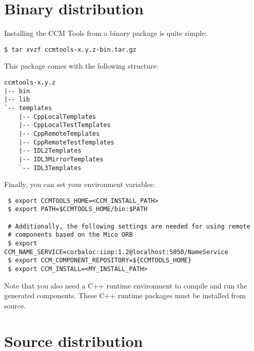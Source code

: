 \section{Binary distribution}

Installing the CCM Tools from a binary package is quite simple:
\begin{small}
\begin{verbatim}
$ tar xvzf ccmtools-x.y.z-bin.tar.gz 
\end{verbatim}
\end{small}

\noindent
This package comes with the following structure:
\begin{small}
\begin{verbatim}
ccmtools-x.y.z
|-- bin
|-- lib
`-- templates
    |-- CppLocalTemplates
    |-- CppLocalTestTemplates
    |-- CppRemoteTemplates
    |-- CppRemoteTestTemplates
    |-- IDL2Templates
    |-- IDL3MirrorTemplates
    `-- IDL3Templates
\end{verbatim}
\end{small}

\noindent
Finally, you can set your environment variables:

\begin{small}
\begin{verbatim}
 $ export CCMTOOLS_HOME=<CCM_INSTALL_PATH>
 $ export PATH=$CCMTOOLS_HOME/bin:$PATH	    

 # Additionally, the following settings are needed for using remote
 # components based on the Mico ORB
 $ export CCM_NAME_SERVICE=corbaloc:iiop:1.2@localhost:5050/NameService
 $ export CCM_COMPONENT_REPOSITORY=${CCMTOOLS_HOME} 
 $ export CCM_INSTALL=<MY_INSTALL_PATH>
\end{verbatim}
\end{small}

\noindent
Note that you also need a C++ runtime environment to compile and run the
generated components.
These C++ runtime packages must be installed from source.


\newpage
\section{Source distribution}


